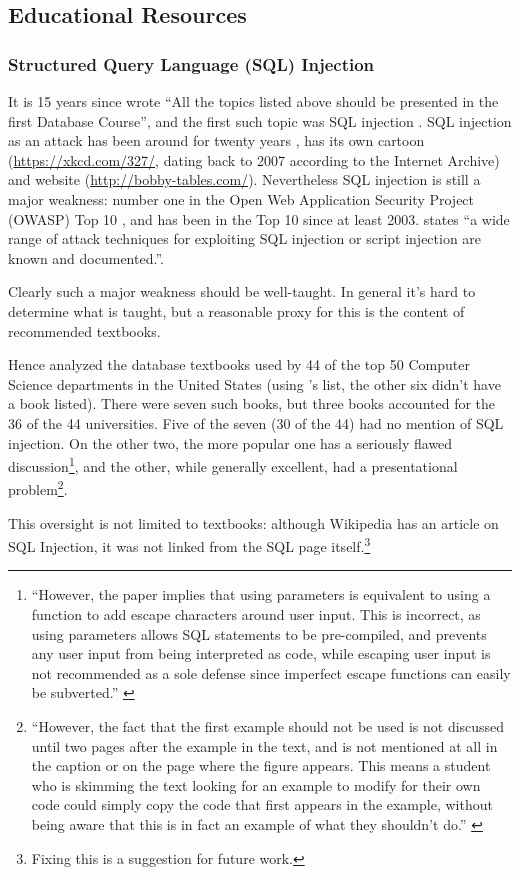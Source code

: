 \documentclass[conference]{IEEEtran}
\begin{document}
\subsection{Educational Resources}\label{sec:EDResource}
\subsubsection{Structured Query Language (SQL) Injection}\label{sec:SQL}
It is 15 years since \cite{Guimaraesetal2004} 
wrote ``All the topics listed above should be presented in the first
Database Course'', and the first such topic was SQL injection \cite{SPIDynamics2002,Anonymous2018b}. SQL injection as an attack has been around for twenty years \cite{HornerHyslip2017a}, has its own cartoon (\url{https://xkcd.com/327/}, dating back to 2007 according to the Internet Archive) and website (\url{http://bobby-tables.com/}). Nevertheless SQL injection is still a major weakness: number one in the Open Web Application Security Project (OWASP) Top 10 \cite{OWASP2017a}, and has been in the Top 10 since at least 2003.  \cite[the UK's definitive reference]{Bristol2018a} states ``a wide range of attack techniques for exploiting SQL
injection or script injection are known and documented.''.

Clearly such a major weakness should be well-taught.  In general it's hard to determine what is taught, but a reasonable proxy for this is the content of recommended textbooks. 

Hence \cite{Drop2019} analyzed the database textbooks used by  44 of the top 50 Computer Science
departments in the United States (using \cite{StangerMartin2015a}'s list, the other six didn't have a book listed). There were seven such books, but three books accounted for the 36 of the 44 universities. Five of the seven (30 of the 44) had no mention of SQL injection. On the other two, the more popular one has a seriously flawed discussion\footnote{``However, the paper implies that using parameters is equivalent to using a function to add escape characters
around user input. This is incorrect, as using parameters allows
SQL statements to be pre-compiled, and prevents any user input
from being interpreted as code, while escaping user input is not
recommended as a sole defense since imperfect escape functions
can easily be subverted.'' \cite{Drop2019}}, and the other, while generally excellent, had a presentational problem\footnote{``However, the fact that the first
example should not be used is not discussed until two pages after
the example in the text, and is not mentioned at all in the caption or
on the page where the figure appears. This means a student who is
skimming the text looking for an example to modify for their own
code could simply copy the code that first appears in the example,
without being aware that this is in fact an example of what they
shouldn't do.'' \cite{Drop2019}}.
\par
This oversight is not limited to textbooks: although Wikipedia has an article on SQL Injection, it was not linked from the SQL page itself.\footnote{Fixing this is a suggestion for future work.}
\end{document}
